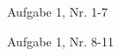 \documentclass[main.tex]{subfiles}
\begin{document}
\begin{figure}[H]
    \caption{Aufgabe 1, Nr. 1-7}
    \label{fig:a1}
\end{figure}

\begin{figure}[H]
    \caption{Aufgabe 1, Nr. 8-11}
    \label{fig:a1}
\end{figure}
\end{document}
